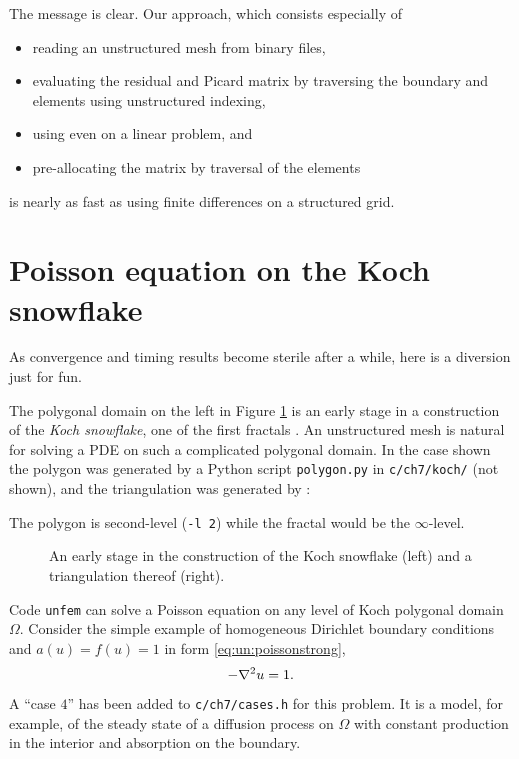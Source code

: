 The message is clear.  Our approach, which consists especially of
\begin{itemize}
\item reading an unstructured mesh from \PETSc binary files,
\item evaluating the residual and Picard matrix by traversing the boundary and elements using unstructured indexing,
\item using \pSNES even on a linear problem, and
\item pre-allocating the matrix by traversal of the elements
\end{itemize}
is nearly as fast as using finite differences on a \pDMDA structured grid.


\section{Poisson equation on the Koch snowflake}

As convergence and timing results become sterile after a while, here is a diversion just for fun.

The polygonal domain on the left in Figure \ref{fig:un:kochpolygonmesh} is an early stage in a construction of the \emph{Koch snowflake}, one of the first fractals \citep{vonKoch1904}.  An unstructured mesh is natural for solving a PDE on such a complicated polygonal domain.  In the case shown the polygon was generated by a Python script \texttt{polygon.py} in \texttt{c/ch7/koch/} (not shown), and the triangulation was generated by \Triangle:
The polygon is second-level (\texttt{-l 2}) while the fractal would be the $\infty$-level.

\begin{figure}
 \qquad 
\caption{An early stage in the construction of the Koch snowflake (left) and a triangulation thereof (right).}
\label{fig:un:kochpolygonmesh}
\end{figure}

Code \texttt{unfem} can solve a Poisson equation on any level of Koch polygonal domain $\Omega$.  Consider the simple example of homogeneous Dirichlet boundary conditions and $a(u)=f(u)=1$ in form \eqref{eq:un:poissonstrong},
\begin{equation}
-\nabla^2 u = 1.\label{eq:un:kochpoisson}
\end{equation}
A ``case $4$'' has been added to \texttt{c/ch7/cases.h} for this problem.  It is a model, for example, of the steady state of a diffusion process on $\Omega$ with constant production in the interior and absorption on the boundary.

